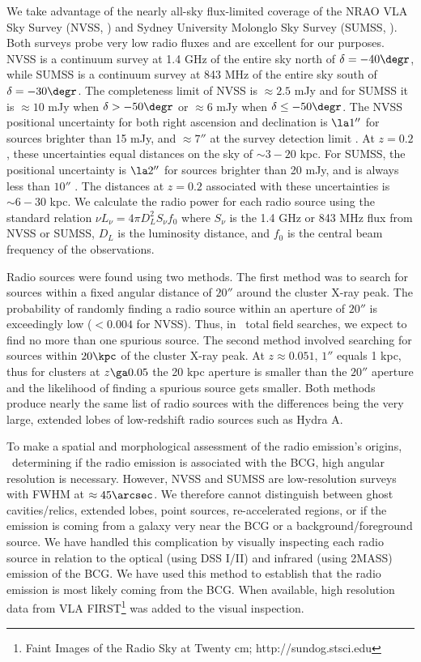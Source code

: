 \documentclass{emulateapj}
\begin{document}
We take advantage of the nearly all-sky flux-limited coverage of the
NRAO VLA Sky Survey (NVSS, \citealt{nvss}) and Sydney University
Molonglo Sky Survey (SUMSS, \citealt{sumss1, sumss2}). Both surveys
probe very low radio fluxes and are excellent for our purposes. NVSS
is a continuum survey at 1.4 GHz of the entire sky north of $\delta =
-40\degr$, while SUMSS is a continuum survey at 843 MHz of the entire
sky south of $\delta = -30\degr$. The completeness limit of NVSS is
$\approx 2.5$ mJy and for SUMSS it is $\approx 10$ mJy when $\delta >
-50\degr$ or $\approx 6$ mJy when $\delta \leq -50\degr$. The NVSS
positional uncertainty for both right ascension and declination is
$\la 1''$ for sources brighter than 15 mJy, and $\approx 7''$ at the
survey detection limit \citep{nvss}. At $z=0.2$, these uncertainties
equal distances on the sky of $\sim3-20$ kpc. For SUMSS, the
positional uncertainty is $\la 2''$ for sources brighter than 20 mJy,
and is always less than $10''$ \citep{sumss1,sumss2}. The distances at
$z=0.2$ associated with these uncertainties is $\sim6-30$ kpc. We
calculate the radio power for each radio source using the standard
relation $\nu L_{\nu} = 4 \pi D_L^2 S_{\nu} f_0$ where $S_{\nu}$ is
the 1.4 GHz or 843 MHz flux from NVSS or SUMSS, $D_L$ is the
luminosity distance, and $f_0$ is the central beam frequency of the
observations.

Radio sources were found using two methods. The first method was to
search for sources within a fixed angular distance of $20''$ around
the cluster X-ray peak. The probability of randomly finding a radio
source within an aperture of $20''$ is exceedingly low ($< 0.004$ for
NVSS). Thus, in \clnum\ total field searches, we expect to find no
more than one spurious source. The second method involved searching
for sources within $20\kpc$ of the cluster X-ray peak. At $z \approx
0.051$, $1''$ equals 1 kpc, thus for clusters at $z \ga 0.05$ the 20
kpc aperture is smaller than the $20''$ aperture and the likelihood of
finding a spurious source gets smaller. Both methods produce nearly
the same list of radio sources with the differences being the very
large, extended lobes of low-redshift radio sources such as Hydra A.

To make a spatial and morphological assessment of the radio emission's
origins, \ie\ determining if the radio emission is associated with the
BCG, high angular resolution is necessary. However, NVSS and SUMSS are
low-resolution surveys with FWHM at $\approx 45\arcsec$. We therefore
cannot distinguish between ghost cavities/relics, extended lobes,
point sources, re-accelerated regions, or if the emission is coming
from a galaxy very near the BCG or a background/foreground source. We
have handled this complication by visually inspecting each radio
source in relation to the optical (using DSS I/II) and infrared (using
2MASS) emission of the BCG. We have used this method to establish that
the radio emission is most likely coming from the BCG. When available,
high resolution data from VLA FIRST\footnote{Faint Images of the Radio
 Sky at Twenty cm; http://sundog.stsci.edu} was added to the
visual inspection.
\end{document}
